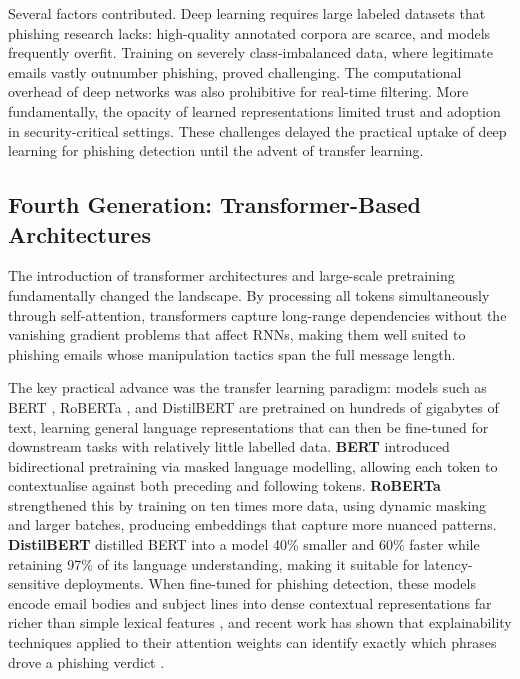 Several factors contributed. Deep learning requires large labeled datasets that phishing research lacks: high-quality annotated corpora are scarce, and models frequently overfit. Training on severely class-imbalanced data, where legitimate emails vastly outnumber phishing, proved challenging. The computational overhead of deep networks was also prohibitive for real-time filtering. More fundamentally, the opacity of learned representations limited trust and adoption in security-critical settings. These challenges delayed the practical uptake of deep learning for phishing detection until the advent of transfer learning.

\subsection{Fourth Generation: Transformer-Based Architectures}

The introduction of transformer architectures \cite{vaswani2023attentionneed} and large-scale pretraining fundamentally changed the landscape. By processing all tokens simultaneously through self-attention, transformers capture long-range dependencies without the vanishing gradient problems that affect RNNs, making them well suited to phishing emails whose manipulation tactics span the full message length.

The key practical advance was the transfer learning paradigm: models such as \ac{BERT} \cite{devlin2019bert}, \acs{RoBERTa} \cite{liu2019roberta}, and \acs{DistilBERT} \cite{sanh2019distilbert} are pretrained on hundreds of gigabytes of text, learning general language representations that can then be fine-tuned for downstream tasks with relatively little labelled data. \textbf{BERT} introduced bidirectional pretraining via masked language modelling, allowing each token to contextualise against both preceding and following tokens. \textbf{RoBERTa} strengthened this by training on ten times more data, using dynamic masking and larger batches, producing embeddings that capture more nuanced patterns. \textbf{DistilBERT} distilled BERT into a model 40\% smaller and 60\% faster while retaining 97\% of its language understanding, making it suitable for latency-sensitive deployments. When fine-tuned for phishing detection, these models encode email bodies and subject lines into dense contextual representations far richer than simple lexical features \cite{uddin2025}, and recent work has shown that explainability techniques applied to their attention weights can identify exactly which phrases drove a phishing verdict \cite{uddin2025}.

